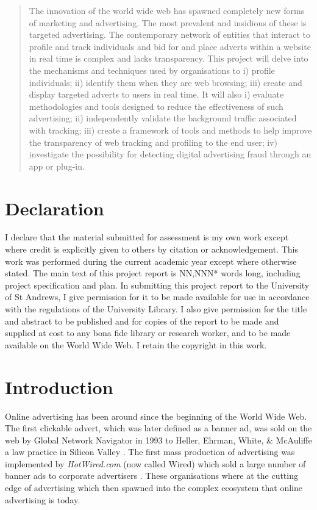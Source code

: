 \documentclass[12pt]{article}
\begin{document}
\pagestyle{plain}
\begin{abstract}
The innovation of the world wide web has spawned  completely new forms of marketing and advertising. The most prevalent and insidious of these  is targeted advertising. The contemporary network of entities that interact to profile and track individuals and  bid for and place adverts within a website in real time is complex and lacks transparency. This project will  delve into the mechanisms and techniques used by organisations to i) profile individuals; ii) identify them when they are web browsing; iii) create and display targeted adverts to users in real time. It will also i) evaluate methodologies and tools designed to reduce the effectiveness of such advertising; ii) independently validate the background traffic associated with tracking; iii) create a framework of tools and methods to help improve the transparency of web tracking and profiling to the end user; iv) investigate the possibility for detecting digital advertising fraud through an app or plug-in.  
\end{abstract}

\section{Declaration}
I declare that the material submitted for assessment is my own work except where credit is explicitly
given to others by citation or acknowledgement. This work was performed during the current academic year
except where otherwise stated. The main text of this project report is NN,NNN* words long,
including project specification and plan. In submitting this project report to the University of St
Andrews, I give permission for it to be made available for use in accordance with the regulations of the
University Library. I also give permission for the title and abstract to be published and for copies of the report to be made and supplied at cost to any bona fide library or research worker, and to be made available on the World Wide Web. I retain the copyright in this work.

\pagebreak

\tableofcontents

\pagebreak

\pagestyle{fancy}
\section{Introduction}
Online advertising has been around since the beginning of the World Wide Web. The first clickable advert, which was later defined as a banner ad, was sold on the web by Global Network Navigator in 1993 to Heller, Ehrman, White, \& McAuliffe a law practice in Silicon Valley \parencite{oreilly}. The first mass production of advertising was implemented by \textit{HotWired.com} (now called Wired) which sold a large number of banner ads to corporate advertisers \parencite{firstAd}. These organisations where at the cutting edge of advertising which then spawned into the complex ecosystem that online advertising is today. \\
\end{document}
